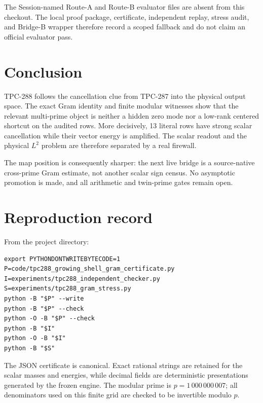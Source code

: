\documentclass[11pt]{article}
\begin{document}
The Session-named Route-A and Route-B evaluator files are absent from this
checkout.  The local proof package, certificate, independent replay, stress
audit, and Bridge-B wrapper therefore record a scoped fallback and do not
claim an official evaluator pass.

\section{Conclusion}

TPC-288 follows the cancellation clue from TPC-287 into the physical output
space.  The exact Gram identity and finite modular witnesses show that the
relevant multi-prime object is neither a hidden zero mode nor a low-rank
centered shortcut on the audited rows.  More decisively, 13 literal rows have
strong scalar cancellation while their vector energy is amplified.  The
scalar readout and the physical $L^2$ problem are therefore separated by a
real firewall.

The map position is consequently sharper: the next live bridge is a
source-native cross-prime Gram estimate, not another scalar sign census.  No
asymptotic promotion is made, and all arithmetic and twin-prime gates remain
open.

\appendix
\section{Reproduction record}

From the project directory:
\begin{verbatim}
export PYTHONDONTWRITEBYTECODE=1
P=code/tpc288_growing_shell_gram_certificate.py
I=experiments/tpc288_independent_checker.py
S=experiments/tpc288_gram_stress.py
python -B "$P" --write
python -B "$P" --check
python -O -B "$P" --check
python -B "$I"
python -O -B "$I"
python -B "$S"
\end{verbatim}

The JSON certificate is canonical.  Exact rational strings are retained for
the scalar masses and energies, while decimal fields are deterministic
presentations generated by the frozen engine.  The modular prime is
$p=1\,000\,000\,007$; all denominators used on this finite grid are checked
to be invertible modulo $p$.



\end{document}
